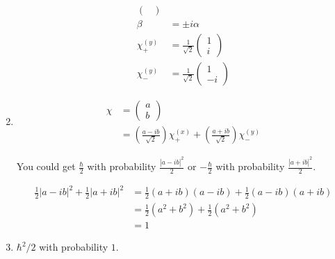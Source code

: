 \documentclass{article}
\begin{document}
\begin{enumerate}
\begin{align*}
\begin{pmatrix}
                                                \end{pmatrix}                               \\
          \beta                           & = \pm i \alpha                                   \\
          \chi_+^{(y)}                    & = \frac{1}{\sqrt{2}} \begin{pmatrix}
                                                                   1 \\
                                                                   i
                                                                 \end{pmatrix}              \\
          \chi_-^{(y)}                    & = \frac{1}{\sqrt{2}} \begin{pmatrix}
                                                                   1 \\
                                                                   -i
                                                                 \end{pmatrix}
        \end{align*}

  \item

        \begin{align*}
          \chi & = \begin{pmatrix}
                     a \\
                     b
                   \end{pmatrix}                                                                                              \\
               & = \left( \frac{a - i b}{\sqrt{2}} \right) \chi_+^{(x)} + \left( \frac{a + i b}{\sqrt{2}} \right) \chi_-^{(y)}
        \end{align*}

        You could get $\frac{\hbar}{2}$ with probability $\frac{|a - i b|^2}{2}$ or $-\frac{\hbar}{2}$ with probability $\frac{|a + i b|^2}{2}$.

        \begin{align*}
          \frac{1}{2} |a - i b|^2 + \frac{1}{2} |a + i b|^2 & = \frac{1}{2} (a + i b) (a - i b) + \frac{1}{2} (a - i b) (a + i b) \\
                                                            & = \frac{1}{2} (a^2 + b^2) + \frac{1}{2} (a^2 + b^2)                 \\
                                                            & = 1
        \end{align*}

  \item $\hbar^2 / 2$ with probability $1$.
\end{enumerate}
\end{document}
